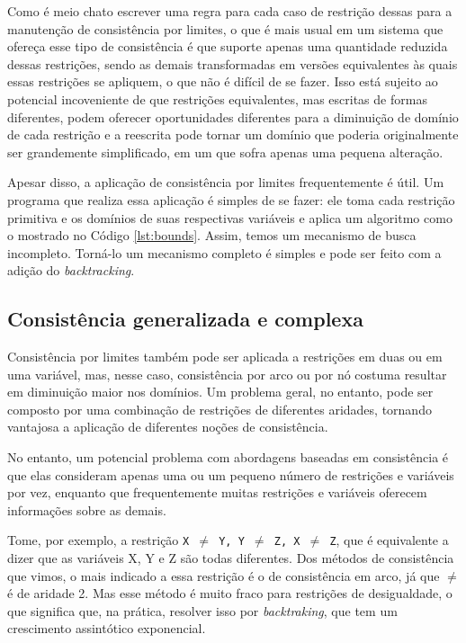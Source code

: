 \documentclass{article}
\begin{document}
Como é meio chato escrever uma regra para cada caso de restrição dessas para a manutenção de consistência por limites, o que é
mais usual em um sistema que ofereça esse tipo de consistência é que suporte apenas uma quantidade reduzida dessas restrições,
sendo as demais transformadas em versões equivalentes às quais essas restrições se apliquem, o que não é difícil de se fazer.
Isso está sujeito ao potencial incoveniente de que restrições equivalentes, mas escritas de formas diferentes, podem oferecer
oportunidades diferentes para a diminuição de domínio de cada restrição e a reescrita pode tornar um domínio que poderia
originalmente ser grandemente simplificado, em um que sofra apenas uma pequena alteração.

Apesar disso, a aplicação de consistência por limites frequentemente é útil. Um programa que realiza essa aplicação é simples
de se fazer: ele toma cada restrição primitiva e os domínios de suas respectivas variáveis e aplica um algoritmo como o mostrado no
Código \ref{lst:bounds}. Assim, temos um mecanismo de busca incompleto. Torná-lo um mecanismo completo é simples e pode ser feito
com a adição do \textit{backtracking}.


\subsection{Consistência generalizada e complexa}

Consistência por limites também pode ser aplicada a restrições em duas ou em uma variável, mas, nesse caso, consistência por
arco ou por nó costuma resultar em diminuição maior nos domínios. Um problema geral, no entanto, pode ser composto por uma
combinação de restrições de diferentes aridades, tornando vantajosa a aplicação de diferentes noções de consistência.

No entanto, um potencial problema com abordagens baseadas em consistência é que elas consideram apenas uma ou um pequeno número de
restrições e variáveis por vez, enquanto que frequentemente muitas restrições e variáveis oferecem informações sobre as demais.

Tome, por exemplo, a restrição {\tt X $\neq$ Y, Y $\neq$ Z, X $\neq$ Z}, que é equivalente a dizer que as variáveis X, Y e Z são todas
diferentes. Dos métodos de consistência que vimos, o mais indicado a essa restrição é o de consistência em arco, já que $\neq$ é
de aridade 2. Mas esse método é muito fraco para restrições de desigualdade, o que significa que, na prática, resolver isso
por \textit{backtraking}, que tem um crescimento assintótico exponencial.%
\end{document}
